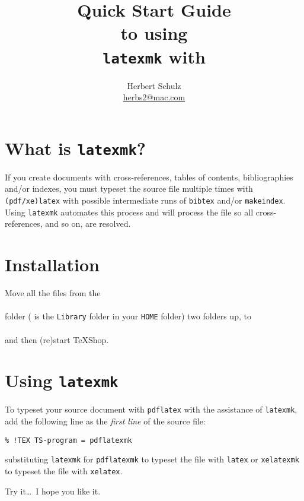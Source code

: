 \documentclass[11pt]{article}
\title{Quick Start Guide\\ to using\\ \texttt{latexmk} with \TS}
\author{Herbert Schulz\\\small\href{mailto:herbs2@mac.com}{herbs2@mac.com}}
\date{}
\newcommand{\TS}{\textsf{\TeX Shop}}
\begin{document}
\maketitle
\thispagestyle{empty}

\section*{What is \texttt{latexmk}?}

If you create documents with cross-references, tables of contents, bibliographies and/or indexes, you must typeset the source file multiple times with \texttt{(pdf/xe)latex} with possible intermediate runs of \texttt{bibtex} and/or \texttt{makeindex}. Using \texttt{latexmk} automates this process and will process the file so all cross-references, and so on, are resolved.

\section*{Installation}

Move all the files from the \\[5pt]
\\[5pt] folder ( is the \texttt{Library} folder in your \texttt{HOME} folder) two folders up, to \\[5pt]
\\[5pt] 
and then (re)start \TS.

\section*{Using \texttt{latexmk}}

To typeset your source document with \texttt{pdflatex} with the assistance of 
\texttt{latexmk}, add the following line as the \emph{first line} of the source file:
\begin{verbatim}
% !TEX TS-program = pdflatexmk
\end{verbatim}
substituting \texttt{latexmk} for \texttt{pdflatexmk} to typeset the file with \texttt{latex} or \texttt{xelatexmk} to typeset the file with \texttt{xelatex}.

\vspace{5pt plus 2pt minus 1pt}\noindent
Try it\dots\ I hope you like it.
\end{document}
